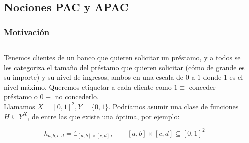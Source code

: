 \subsection{Nociones PAC y APAC}
\begin{frame}\frametitle{Motivación}
\begin{columns}
 \begin{column}{0.45\textwidth}
  Tenemos clientes de un banco que quieren solicitar un préstamo, y a todos se les categoriza
  el tamaño del préstamo que quieren solicitar (cómo de grande es su importe) y su nivel de ingresos, ambos 
  en una escala de $0$ a $1$ donde $1$ es el nivel máximo. Queremos etiquetar a cada cliente como $1\equiv$ conceder préstamo o 
  $0\equiv$ no concederlo.\\
  \bigskip
  Llamamos $X=[0,1]^2, Y=\{0,1\}$. Podríamos asumir una clase de funciones $H \subseteq Y^X$, de entre las que existe
  una óptima, por ejemplo:

  \[h_{a,b,c,d} = \mathds{1}_{[a,b]\times[c,d]}, \qquad [a,b]\times [c,d] \subseteq [0,1]^2\]
 \end{column}
 \begin{column}{0.55\textwidth}
 \end{column}
\end{columns}
\end{frame}


